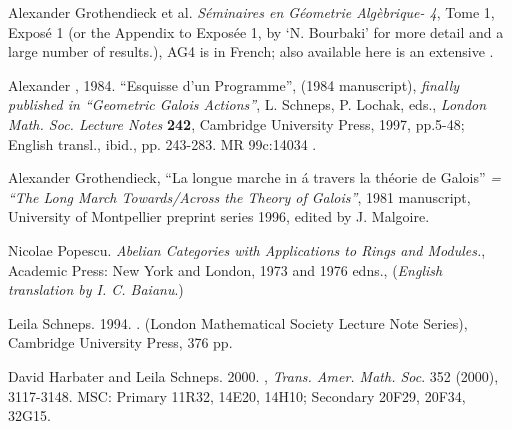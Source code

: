\documentclass[12pt]{article}
\theoremstyle{plain}
\theoremstyle{definition}
\numberwithin{equation}{section}
\newcommand{\<}{{\langle}}
\begin{document}
\begin{thebibliography}{9}

Alexander Grothendieck et al. \emph{S\'eminaires en G\'eometrie Alg\`ebrique- 4}, Tome 1, Expos\'e 1 
(or the Appendix to Expos\'ee 1, by `N. Bourbaki' for more detail and a large number of results.),
AG4 is  in French;
also available here is an extensive 
.


Alexander , 1984. ``Esquisse d'un Programme'', (1984 manuscript), {\em finally published in ``Geometric Galois Actions''}, L. Schneps, P. Lochak, eds., 
{\em London Math. Soc. Lecture Notes} {\bf 242}, Cambridge University Press, 1997, pp.5-48;
English transl., ibid., pp. 243-283. MR 99c:14034 .

Alexander Grothendieck, ``La longue marche in \'a travers la th\'eorie de Galois'' 
\emph{= ``The Long March Towards/Across the Theory of Galois''}, 1981 manuscript, University of Montpellier preprint series 1996, edited by J. Malgoire. 

Nicolae Popescu. {\em Abelian Categories with Applications to Rings and Modules.},
Academic Press: New York and London, 1973 and 1976 edns., ({\em English translation by I. C. Baianu}.)

Leila Schneps. 1994. 
.
(London Mathematical Society Lecture Note Series), Cambridge University Press, 376 pp.

David Harbater and Leila Schneps. 2000.
, \emph{Trans. Amer. Math. Soc}. 352 (2000), 3117-3148. 
MSC: Primary 11R32, 14E20, 14H10; Secondary 20F29, 20F34, 32G15.

\end{thebibliography}

\end{document}

